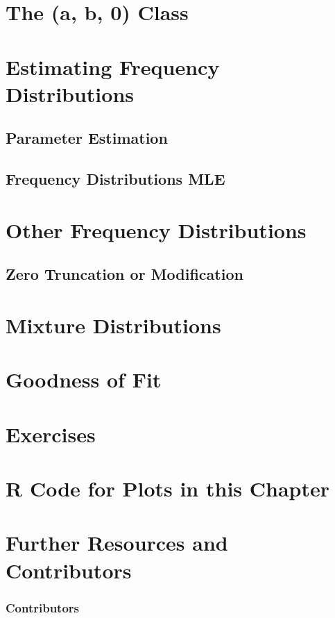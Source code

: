 \documentclass[]{book}
\begin{document}
\section{The (a, b, 0) Class}\label{S:the-a-b-0-class}

\section{Estimating Frequency
Distributions}\label{S:estimating-frequency-distributions}

\subsection{Parameter Estimation}\label{S:parameter-estimation}

\subsection{Frequency Distributions
MLE}\label{S:frequency-distributions-mle}

\section{Other Frequency
Distributions}\label{S:other-frequency-distributions}

\subsection{Zero Truncation or
Modification}\label{S:zero-truncation-or-modification}

\section{Mixture Distributions}\label{S:mixture-distributions}

\section{Goodness of Fit}\label{S:goodness-of-fit}

\section{Exercises}\label{S:exercises}

\section{R Code for Plots in this Chapter}\label{S:rcode}

\section{Further Resources and
Contributors}\label{Freq-further-reading-and-resources}

\subsubsection*{Contributors}\label{contributors-1}


\end{document}
